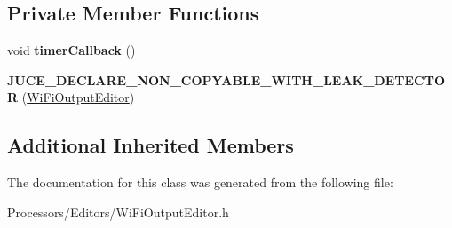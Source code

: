 \subsection*{Private Member Functions}
\begin{DoxyCompactItemize}
\item 
\hypertarget{classWiFiOutputEditor_a6f4c3d91681b89d9a76bfe496d5ec586}{void {\bfseries timer\-Callback} ()}\label{classWiFiOutputEditor_a6f4c3d91681b89d9a76bfe496d5ec586}

\item 
\hypertarget{classWiFiOutputEditor_ae99003438168827bc318d1e9a6a7337b}{{\bfseries J\-U\-C\-E\-\_\-\-D\-E\-C\-L\-A\-R\-E\-\_\-\-N\-O\-N\-\_\-\-C\-O\-P\-Y\-A\-B\-L\-E\-\_\-\-W\-I\-T\-H\-\_\-\-L\-E\-A\-K\-\_\-\-D\-E\-T\-E\-C\-T\-O\-R} (\hyperlink{classWiFiOutputEditor}{Wi\-Fi\-Output\-Editor})}\label{classWiFiOutputEditor_ae99003438168827bc318d1e9a6a7337b}

\end{DoxyCompactItemize}
\subsection*{Additional Inherited Members}


The documentation for this class was generated from the following file\-:\begin{DoxyCompactItemize}
\item 
Processors/\-Editors/Wi\-Fi\-Output\-Editor.\-h\end{DoxyCompactItemize}
